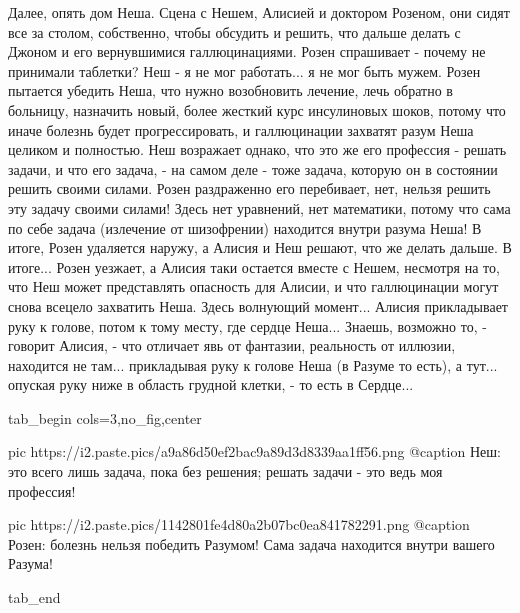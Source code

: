 Далее, опять дом Неша. Сцена с Нешем, Алисией и доктором Розеном, они сидят все
за столом, собственно, чтобы обсудить и решить, что дальше делать с Джоном и
его вернувшимися галлюцинациями. Розен спрашивает - почему не принимали
таблетки? Неш - я не мог работать...  я не мог быть мужем. Розен пытается
убедить Неша, что нужно возобновить лечение, лечь обратно в больницу, назначить
новый, более жесткий курс инсулиновых шоков, потому что иначе болезнь будет
прогрессировать, и галлюцинации захватят разум Неша целиком и полностью. Неш
возражает однако, что это же его профессия - решать задачи, и что его задача, -
на самом деле - тоже задача, которую он в состоянии решить своими силами. Розен
раздраженно его перебивает, нет, нельзя решить эту задачу своими силами! Здесь
нет уравнений, нет математики, потому что сама по себе задача (излечение от
шизофрении) находится внутри разума Неша!  В итоге, Розен удаляется наружу, а
Алисия и Неш решают, что же делать дальше. В итоге... Розен уезжает, а Алисия
таки остается вместе с Нешем, несмотря на то, что Неш может представлять
опасность для Алисии, и что галлюцинации могут снова всецело захватить Неша.
Здесь волнующий момент... Алисия прикладывает руку к голове, потом к тому
месту, где сердце Неша... Знаешь, возможно то, - говорит Алисия, - что отличает
явь от фантазии, реальность от иллюзии, находится не там... прикладывая руку к голове Неша (в Разуме то
есть), а тут... опуская руку ниже в область грудной клетки, - то есть в
Сердце... 

\ifcmt
  tab_begin cols=3,no_fig,center

     pic https://i2.paste.pics/a9a86d50ef2bac9a89d3d8339aa1ff56.png
		 @caption Неш: это всего лишь задача, пока без решения; решать задачи - это ведь моя профессия!

		 pic https://i2.paste.pics/1142801fe4d80a2b07bc0ea841782291.png
		 @caption Розен: болезнь нельзя победить Разумом! Сама задача находится внутри вашего Разума!

  tab_end
\fi


